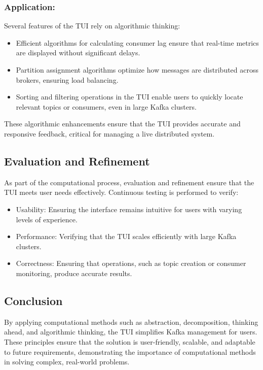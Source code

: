 \documentclass[10pt , a4paper]{report}
\begin{document}
\subsubsection*{Application:}  
Several features of the TUI rely on algorithmic thinking:
\begin{itemize}
    \item Efficient algorithms for calculating consumer lag ensure that real-time metrics are displayed without significant delays.
    \item Partition assignment algorithms optimize how messages are distributed across brokers, ensuring load balancing.
    \item Sorting and filtering operations in the TUI enable users to quickly locate relevant topics or consumers, even in large Kafka clusters.
\end{itemize}

These algorithmic enhancements ensure that the TUI provides accurate and responsive feedback, critical for managing a live distributed system.

\subsection{Evaluation and Refinement}

As part of the computational process, evaluation and refinement ensure that the TUI meets user needs effectively. Continuous testing is performed to verify:
\begin{itemize}
    \item Usability: Ensuring the interface remains intuitive for users with varying levels of experience.
    \item Performance: Verifying that the TUI scales efficiently with large Kafka clusters.
    \item Correctness: Ensuring that operations, such as topic creation or consumer monitoring, produce accurate results.
\end{itemize}

\subsection{Conclusion}

By applying computational methods such as abstraction, decomposition, thinking ahead, and algorithmic thinking, the TUI simplifies Kafka management for users. These principles ensure that the solution is user-friendly, scalable, and adaptable to future requirements, demonstrating the importance of computational methods in solving complex, real-world problems.
\end{document}
